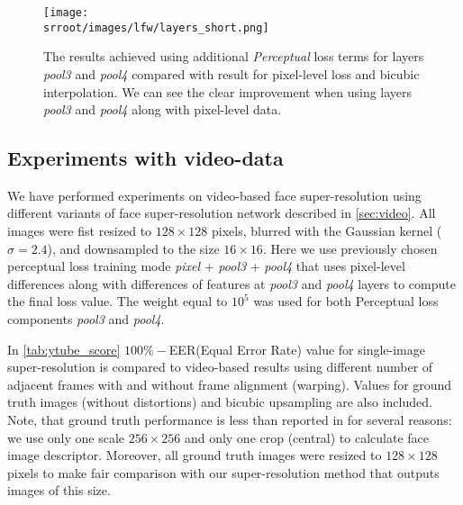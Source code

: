 


\begin{figure}[t]



\texttt{[image: \\srroot/images/lfw/layers\_short.png]}

\caption{The results achieved using additional \emph{Perceptual} loss terms for layers \emph{pool3} and \emph{pool4} compared with result for pixel-level loss and bicubic interpolation. We can see the clear improvement when using layers \emph{pool3} and \emph{pool4} along with pixel-level data.}

\label{fig:layers}



\vspace{10pt}
\end{figure}

\subsection{Experiments with video-data}

We have performed experiments on video-based face super-resolution using different variants of face super-resolution network described in \ref{sec:video}. All images were fist resized to $128\times128$ pixels, blurred with the Gaussian kernel ($\sigma = 2.4 $), and downsampled to the size $16\times16$. 
Here we use previously chosen perceptual loss training mode \emph{pixel} + \emph{pool3} + \emph{pool4} that uses pixel-level differences along with differences of features at \emph{pool3} and \emph{pool4} layers to compute the final loss value. The weight equal to $10^5$ was used for both Perceptual loss components  \emph{pool3} and \emph{pool4}.


In \ref{tab:ytube_score} $100\%-$EER(Equal Error Rate) value for single-image super-resolution is compared to video-based results using different number of adjacent frames with and without frame alignment (warping). Values for ground truth images (without distortions) and bicubic upsampling are also included. Note, that ground truth performance is less than reported in \cite{ParkhiVZ15} for several reasons: we use only one scale $256\times256$ and only one crop (central) to calculate face image descriptor. Moreover, all ground truth images were resized to $128\times128$ pixels to make fair comparison with our super-resolution method that outputs images of this size. 

